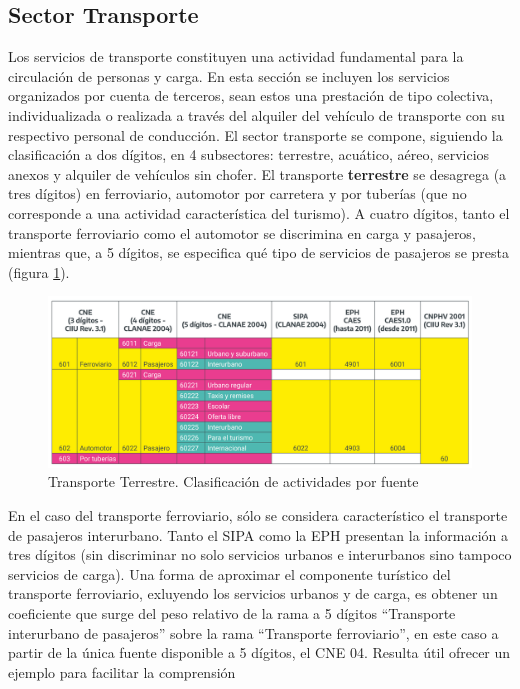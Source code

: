 \documentclass[
  openany]{book}
\begin{document}
\hypertarget{sector-transporte}{%
\subsection{Sector Transporte}\label{sector-transporte}}

Los servicios de transporte constituyen una actividad fundamental para la circulación de personas y carga.
En esta sección se incluyen los servicios organizados por cuenta de terceros, sean estos una prestación de tipo colectiva, individualizada o realizada a través del alquiler del vehículo de transporte con su respectivo personal de conducción.
El sector transporte se compone, siguiendo la clasificación a dos dígitos, en 4 subsectores: terrestre, acuático, aéreo, servicios anexos y alquiler de vehículos sin chofer.
El transporte \textbf{terrestre} se desagrega (a tres dígitos) en ferroviario, automotor por carretera y por tuberías (que no corresponde a una actividad característica del turismo).
A cuatro dígitos, tanto el transporte ferroviario como el automotor se discrimina en carga y pasajeros, mientras que, a 5 dígitos, se especifica qué tipo de servicios de pasajeros se presta (figura \ref{fig:empleofuentes6}).

\begin{figure}

{\centering \includegraphics[width=0.8\linewidth]{imagenes/figura3.6} 

}

\caption{Transporte Terrestre. Clasificación de actividades por fuente}\label{fig:empleofuentes6}
\end{figure}

En el caso del transporte ferroviario, sólo se considera característico el transporte de pasajeros interurbano.
Tanto el SIPA como la EPH presentan la información a tres dígitos (sin discriminar no solo servicios urbanos e interurbanos sino tampoco servicios de carga).
Una forma de aproximar el componente turístico del transporte ferroviario, exluyendo los servicios urbanos y de carga, es obtener un coeficiente que surge del peso relativo de la rama a 5 dígitos ``Transporte interurbano de pasajeros'' sobre la rama ``Transporte ferroviario'', en este caso a partir de la única fuente disponible a 5 dígitos, el CNE 04.
Resulta útil ofrecer un ejemplo para facilitar la comprensión
\end{document}
